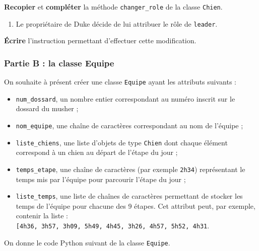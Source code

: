 \documentclass[
  paper=a4,
  ,captions=tableheading
]{scrartcl}
\providecommand{\tightlist}{%
  \setlength{\itemsep}{0pt}\setlength{\parskip}{0pt}}
\begin{document}
\textbf{Recopier} et \textbf{compléter} la méthode
\texttt{changer\_role} de la classe \texttt{Chien}.

\begin{enumerate}
\def\labelenumi{\arabic{enumi}.}
\setcounter{enumi}{2}
\tightlist
\item
  Le propriétaire de Duke décide de lui attribuer le rôle de
  \texttt{\textquotesingle{}leader\textquotesingle{}}.
\end{enumerate}

\textbf{Écrire} l'instruction permettant d'effectuer cette modification.

\subsubsection{Partie B : la classe
Equipe}\label{partie-b-la-classe-equipe}

On souhaite à présent créer une classe \texttt{Equipe} ayant les
attributs suivants :

\begin{itemize}
\tightlist
\item
  \texttt{num\_dossard}, un nombre entier correspondant au numéro
  inscrit sur le dossard du musher ;
\item
  \texttt{nom\_equipe}, une chaîne de caractères correspondant au nom de
  l'équipe ;
\item
  \texttt{liste\_chiens}, une liste d'objets de type \texttt{Chien} dont
  chaque élément correspond à un chien au départ de l'étape du jour ;
\item
  \texttt{temps\_etape}, une chaîne de caractères (par exemple
  \texttt{\textquotesingle{}2h34\textquotesingle{}}) représentant le
  temps mis par l'équipe pour parcourir l'étape du jour ;
\item
  \texttt{liste\_temps}, une liste de chaînes de caractères permettant
  de stocker les temps de l'équipe pour chacune des 9 étapes. Cet
  attribut peut, par exemple, contenir la liste :
  \texttt{{[}\textquotesingle{}4h36\textquotesingle{},\ \textquotesingle{}3h57\textquotesingle{},\ \textquotesingle{}3h09\textquotesingle{},\ \textquotesingle{}5h49\textquotesingle{},\ \textquotesingle{}4h45\textquotesingle{},\ \textquotesingle{}3h26\textquotesingle{},\ \textquotesingle{}4h57\textquotesingle{},\ \textquotesingle{}5h52\textquotesingle{},\ \textquotesingle{}4h31\textquotesingle{}{]}}.
\end{itemize}

On donne le code Python suivant de la classe \texttt{Equipe}.
\end{document}
